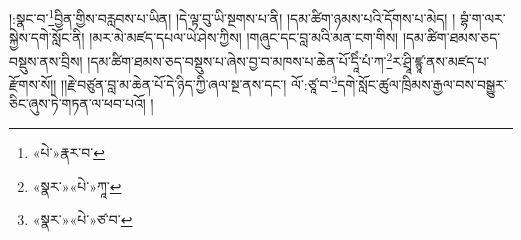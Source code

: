 །:སྣང་བ་\footnote{«པེ་»རྣར་བ་}བྱིན་གྱིས་བརླབས་པ་ཡིན། །དེ་ལྟ་བུ་ཡི་སྔགས་པ་ནི། །དམ་ཚིག་ཉམས་པའི་དོགས་པ་མེད། །
བྷཾ་ག་ལར་སྐྱེས་དགེ་སློང་ནི། །མར་མེ་མཛད་དཔལ་ཡེ་ཤེས་ཀྱིས། །གཞུང་དང་བླ་མའི་མན་ངག་གིས། །དམ་ཚིག་ཐམས་ཅད་བསྡུས་ནས་བྲིས། །དམ་ཚིག་ཐམས་ཅད་བསྡུས་པ་ཞེས་བྱ་བ་མཁས་པ་ཆེན་པོ་དཱིཾ་པཾ་ཀ་\footnote{«སྣར་»«པེ་»ཀཱ་}ར་ཤྲཱི་ཛྙཱ་ནས་མཛད་པ་རྫོགས་སོ།། །།རྗེ་བཙུན་བླ་མ་ཆེན་པོ་དེ་ཉིད་ཀྱི་ཞལ་སྔ་ནས་དང་། ལོ་:ཙཱ་བ་\footnote{«སྣར་»«པེ་»ཙ་བ་}དགེ་སློང་ཚུལ་ཁྲིམས་རྒྱལ་བས་བསྒྱུར་ཅིང་ཞུས་ཏེ་གཏན་ལ་ཕབ་པའོ། ། 